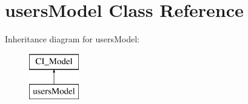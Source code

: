 \hypertarget{classusers_model}{}\section{users\+Model Class Reference}
\label{classusers_model}
Inheritance diagram for users\+Model\+:\begin{figure}[H]
\begin{center}
\leavevmode
\includegraphics[height=2.000000cm]{classusers_model}
\end{center}
\end{figure}
